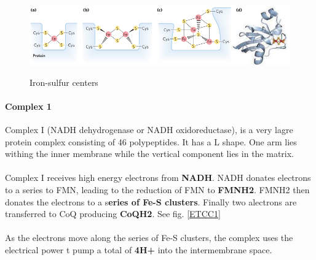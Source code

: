 \documentclass[../main.tex]{subfiles}
\begin{document}
\begin{figure}[H]
	\centering
	\includegraphics[width = 0.7 \textwidth]{ETC1}
	\label{ETC1}
	\caption{Iron-sulfur centers}
\end{figure}

\paragraph{Complex 1}
Complex I (NADH dehydrogenase or NADH oxidoreductase), is a very lagre protein complex consisting of 46 polypeptides. It has a L shape. One arm  lies withing the inner membrane while the vertical component lies in the matrix. \\
\\
Complex I receives high energy electrons from \textbf{NADH}. NADH donates electrons to a series to FMN, leading to the reduction of FMN to \textbf{FMNH2}. FMNH2 then donates the electrons to a s\textbf{eries of Fe-S clusters}. Finally two alectrons are transferred to CoQ producing \textbf{CoQH2}. See fig. \ref{ETCC1}\\
\\
As the electrons move along the series of Fe-S clusters, the complex uses the electrical power t pump a total of \textbf{4H+} into the intermembrane space. 

\begin{figure}[H]
	\centering
	\caption{}
\end{figure}
\end{document}

